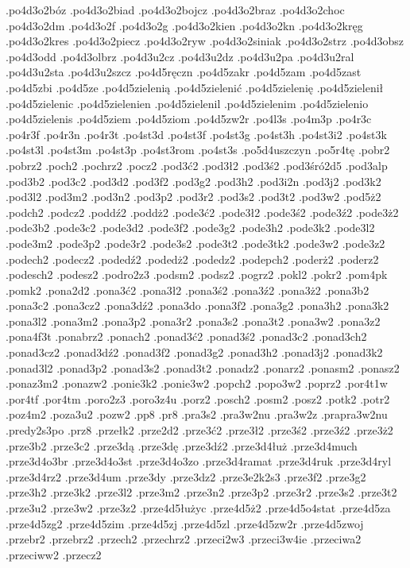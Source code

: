 {.po4d3o2bóz
.po4d3o2biad
.po4d3o2bojcz
.po4d3o2braz
.po4d3o2choc
.po4d3o2dm
.po4d3o2f
.po4d3o2g
.po4d3o2kien
.po4d3o2kn
.po4d3o2kręg
.po4d3o2kres
.po4d3o2piecz
.po4d3o2ryw
.po4d3o2siniak
.po4d3o2strz
.po4d3obsz
.po4d3odd
.po4d3olbrz
.po4d3u2cz
.po4d3u2dz
.po4d3u2pa
.po4d3u2ral
.po4d3u2sta
.po4d3u2szcz
.po4d5ręczn
.po4d5zakr
.po4d5zam
.po4d5zast
.po4d5zbi
.po4d5ze
.po4d5zielenią
.po4d5zielenić
.po4d5zielenię
.po4d5zielenił
.po4d5zielenic
.po4d5zielenien
.po4d5zielenil
.po4d5zielenim
.po4d5zielenio
.po4d5zielenis
.po4d5ziem
.po4d5ziom
.po4d5zw2r
.po4l3s
.po4m3p
.po4r3c
.po4r3f
.po4r3n
.po4r3t
.po4st3d
.po4st3f
.po4st3g
.po4st3h
.po4st3i2
.po4st3k
.po4st3l
.po4st3m
.po4st3p
.po4st3rom
.po4st3s
.po5d4uszczyn
.po5r4tę
.pobr2
.pobrz2
.poch2
.pochrz2
.pocz2
.pod3ć2
.pod3ł2
.pod3ś2
.pod3śró2d5
.pod3alp
.pod3b2
.pod3c2
.pod3d2
.pod3f2
.pod3g2
.pod3h2
.pod3i2n
.pod3j2
.pod3k2
.pod3l2
.pod3m2
.pod3n2
.pod3p2
.pod3r2
.pod3s2
.pod3t2
.pod3w2
.pod5ż2
.podch2
.podcz2
.poddź2
.poddż2
.pode3ć2
.pode3ł2
.pode3ś2
.pode3ź2
.pode3ż2
.pode3b2
.pode3c2
.pode3d2
.pode3f2
.pode3g2
.pode3h2
.pode3k2
.pode3l2
.pode3m2
.pode3p2
.pode3r2
.pode3s2
.pode3t2
.pode3tk2
.pode3w2
.pode3z2
.podech2
.podecz2
.podedź2
.podedż2
.podedz2
.podepch2
.poderż2
.poderz2
.podesch2
.podesz2
.podro2z3
.podsm2
.podsz2
.pogrz2
.pokl2
.pokr2
.pom4pk
.pomk2
.pona2d2
.pona3ć2
.pona3ł2
.pona3ś2
.pona3ź2
.pona3ż2
.pona3b2
.pona3c2
.pona3cz2
.pona3dź2
.pona3do
.pona3f2
.pona3g2
.pona3h2
.pona3k2
.pona3l2
.pona3m2
.pona3p2
.pona3r2
.pona3s2
.pona3t2
.pona3w2
.pona3z2
.pona4f3t
.ponabrz2
.ponach2
.ponad3ć2
.ponad3ś2
.ponad3c2
.ponad3ch2
.ponad3cz2
.ponad3dź2
.ponad3f2
.ponad3g2
.ponad3h2
.ponad3j2
.ponad3k2
.ponad3l2
.ponad3p2
.ponad3s2
.ponad3t2
.ponadz2
.ponarz2
.ponasm2
.ponasz2
.ponaz3m2
.ponazw2
.ponie3k2
.ponie3w2
.popch2
.popo3w2
.poprz2
.por4t1w
.por4tf
.por4tm
.poro2z3
.poro3z4u
.porz2
.posch2
.posm2
.posz2
.potk2
.potr2
.poz4m2
.poza3u2
.pozw2
.pp8
.pr8
.pra3s2
.pra3w2nu
.pra3w2z
.prapra3w2nu
.predy2s3po
.prz8
.przełk2
.prze2d2
.prze3ć2
.prze3ł2
.prze3ś2
.prze3ź2
.prze3ż2
.prze3b2
.prze3c2
.prze3dą
.prze3dę
.prze3dź2
.prze3d4łuż
.prze3d4much
.prze3d4o3br
.prze3d4o3st
.prze3d4o3zo
.prze3d4ramat
.prze3d4ruk
.prze3d4ryl
.prze3d4rz2
.prze3d4um
.prze3dy
.prze3dz2
.prze3e2k2s3
.prze3f2
.prze3g2
.prze3h2
.prze3k2
.prze3l2
.prze3m2
.prze3n2
.prze3p2
.prze3r2
.prze3s2
.prze3t2
.prze3u2
.prze3w2
.prze3z2
.prze4d5łużyc
.prze4d5ż2
.prze4d5o4stat
.prze4d5za
.prze4d5zg2
.prze4d5zim
.prze4d5zj
.prze4d5zl
.prze4d5zw2r
.prze4d5zwoj
.przebr2
.przebrz2
.przech2
.przechrz2
.przeci2w3
.przeci3w4ie
.przeciwa2
.przeciww2
.przecz2
}
